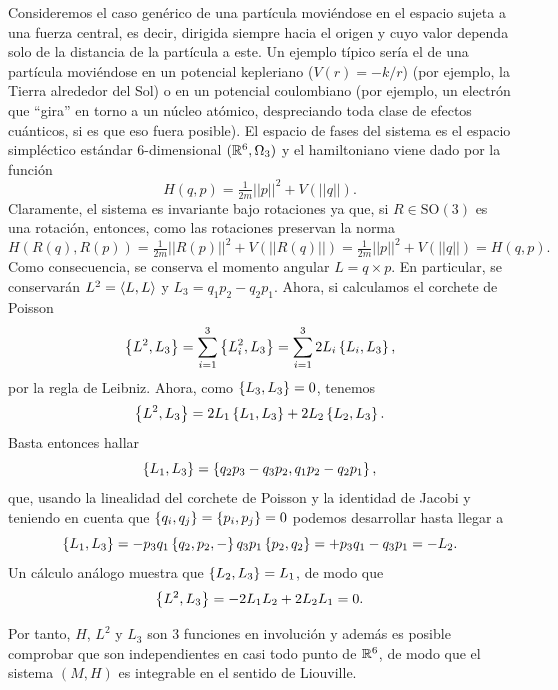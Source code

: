   Consideremos el caso genérico de una partícula moviéndose en el espacio sujeta a una fuerza central, es decir, dirigida siempre hacia el origen y cuyo valor dependa solo de la distancia de la partícula a este. Un ejemplo típico sería el de una partícula moviéndose en un potencial kepleriano ($V(r)=-k/r$) (por ejemplo, la Tierra alrededor del Sol) o en un potencial coulombiano (por ejemplo, un electrón que ``gira'' en torno a un núcleo atómico, despreciando toda clase de efectos cuánticos, si es que eso fuera posible). El espacio de fases del sistema es el espacio simpléctico estándar $6$-dimensional $(\mathbb{R}^6,\Omega_3)$ y el hamiltoniano viene dado por la función
  \begin{equation*}
    H(q,p)=\tfrac{1}{2m}||p||^2+V(||q||).
  \end{equation*}
  Claramente, el sistema es invariante bajo rotaciones ya que, si $R\in \mathrm{SO}(3)$ es una rotación, entonces, como las rotaciones preservan la norma
  \begin{equation*}
    H(R(q),R(p))=\tfrac{1}{2m}||R(p)||^2+V(||R(q)||)=\tfrac{1}{2m}||p||^2+V(||q||)=H(q,p).
  \end{equation*}
  Como consecuencia, se conserva el momento angular $L=q\times p$. En particular, se conservarán $L^2=\left\langle L,L\right\rangle$ y $L_3=q_1p_2-q_2p_1$. Ahora, si calculamos el corchete de Poisson
  \begin{equation*}
    \left\lbrace L^2,L_3\right\rbrace=\sum_{i=1}^3\left\lbrace L_i^2,L_3\right\rbrace=\sum_{i=1}^32L_i\left\lbrace L_i,L_3\right\rbrace,
  \end{equation*}
  por la regla de Leibniz. Ahora, como $\left\lbrace L_3,L_3\right\rbrace=0$, tenemos 
  \begin{equation*}
    \left\lbrace L^2,L_3\right\rbrace=2L_1\left\lbrace L_1,L_3\right\rbrace+2L_2\left\lbrace L_2,L_3\right\rbrace.
  \end{equation*}
  Basta entonces hallar 
  \begin{equation*}
    \left\lbrace L_1,L_3\right\rbrace=\left\lbrace q_2p_3-q_3p_2,q_1p_2-q_2p_1\right\rbrace,
  \end{equation*}
  que, usando la linealidad del corchete de Poisson y la identidad de Jacobi y teniendo en cuenta que $\left\lbrace q_i,q_j\right\rbrace=\left\lbrace p_i,p_j\right\rbrace=0$ podemos desarrollar hasta llegar a
  \begin{equation*}
    \left\lbrace L_1,L_3\right\rbrace=-p_3q_1\left\lbrace q_2,p_2,-\right\rbrace q_3p_1\left\lbrace p_2,q_2\right\rbrace=+p_3q_1-q_3p_1=-L_2.
  \end{equation*}
Un cálculo análogo muestra que $\left\lbrace L_2,L_3\right\rbrace=L_1$, de modo que
\begin{equation*}
  \left\lbrace L^2,L_3\right\rbrace=-2L_1L_2+2L_2L_1=0.
\end{equation*}

Por tanto, $H$, $L^2$ y $L_3$ son $3$ funciones en involución y además es posible comprobar que son independientes en casi todo punto de $\mathbb{R}^6$, de modo que el sistema $(M,H)$ es integrable en el sentido de Liouville.

